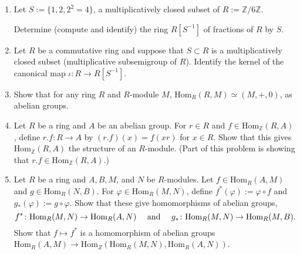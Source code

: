 \documentclass[12pt]{article}
\newcommand{\ZZ}{{\mathbb Z}}
\newcommand{\Hom}{\mbox{Hom}}
\begin{document}
\begin{enumerate}

\item Let  $S:=\{1,2,2^2=4\}$, a multiplicatively closed subset of $R:=\ZZ/6\ZZ$.

  Determine (compute and identify) the ring  $R[S^{-1}]$ of fractions of $R$ by $S$.
   \vspace{-2pt} 


 \item Let $R$ be a commutative ring and suppose that  $S\subset R$ is a multiplicatively closed subset (multiplicative
   subsemigroup of $R$).
   Identify the kernel of the canonical map $\iota \colon R \to R[S^{-1}]$.
   \vspace{-2pt}


 \item Show that for any ring $R$ and $R$-module $M$, $\Hom_R(R,M)\simeq (M,+,0)$, as abelian groups.
   \vspace{-2pt}

 \item  Let $R$ be a ring and $A$ be an abelian group.
   For $r\in R$ and $f\in\Hom_{\ZZ}(R,A)$, define $r.f\colon R\to A$ by $(r.f)(x)=f(xr)$ for $x\in R$.
   Show that this gives $\Hom_{\ZZ}(R,A)$ the structure of an $R$-module.
   (Part of this problem is showing that $r.f\in\Hom_{\ZZ}(R,A)$.) \vspace{-2pt}

 \item Let $R$ be a ring and $A,B,M$, and $N$ be $R$-modules.
   Let $f\in\Hom_R(A,M)$ and $g\in\Hom_R(N,B)$.
   For $\varphi\in\Hom_R(M,N)$, define $f^*(\varphi):= \varphi\circ f$ and $g_*(\varphi):=g\circ\varphi$.
   Show that these give homomorphisms of abelian groups,
   \[
   f^*\colon \Hom_R(M,N)\to\Hom_R(A,N)
   \quad\mbox{ and }\quad
   g_*\colon \Hom_R(M,N)\to\Hom_R(M,B).   \vspace{-2pt}
   \]
   Show that $f\mapsto f^*$ is a homomorphism of abelian groups $\Hom_R(A,M)\to\Hom_Z(\Hom_R(M,N),\Hom_R(A,N))$.


\end{enumerate}
\end{document}
